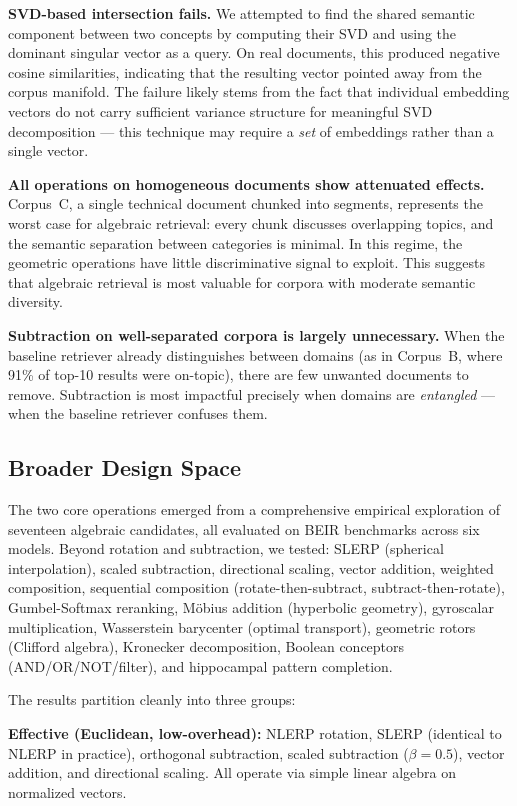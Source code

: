 \documentclass{article}
\begin{document}
\textbf{SVD-based intersection fails.} We attempted to find the shared semantic component between two concepts by computing their SVD and using the dominant singular vector as a query. On real documents, this produced negative cosine similarities, indicating that the resulting vector pointed away from the corpus manifold. The failure likely stems from the fact that individual embedding vectors do not carry sufficient variance structure for meaningful SVD decomposition --- this technique may require a \emph{set} of embeddings rather than a single vector.

\textbf{All operations on homogeneous documents show attenuated effects.} Corpus~C, a single technical document chunked into segments, represents the worst case for algebraic retrieval: every chunk discusses overlapping topics, and the semantic separation between categories is minimal. In this regime, the geometric operations have little discriminative signal to exploit. This suggests that algebraic retrieval is most valuable for corpora with moderate semantic diversity.

\textbf{Subtraction on well-separated corpora is largely unnecessary.} When the baseline retriever already distinguishes between domains (as in Corpus~B, where 91\% of top-10 results were on-topic), there are few unwanted documents to remove. Subtraction is most impactful precisely when domains are \emph{entangled} --- when the baseline retriever confuses them.

\subsection{Broader Design Space}

The two core operations emerged from a comprehensive empirical exploration of seventeen algebraic candidates, all evaluated on BEIR benchmarks across six models. Beyond rotation and subtraction, we tested: SLERP (spherical interpolation), scaled subtraction, directional scaling, vector addition, weighted composition, sequential composition (rotate-then-subtract, subtract-then-rotate), Gumbel-Softmax reranking, M\"{o}bius addition (hyperbolic geometry), gyroscalar multiplication, Wasserstein barycenter (optimal transport), geometric rotors (Clifford algebra), Kronecker decomposition, Boolean conceptors (AND/OR/NOT/filter), and hippocampal pattern completion.

The results partition cleanly into three groups:

\textbf{Effective (Euclidean, low-overhead):} NLERP rotation, SLERP (identical to NLERP in practice), orthogonal subtraction, scaled subtraction ($\beta = 0.5$), vector addition, and directional scaling. All operate via simple linear algebra on normalized vectors.
\end{document}
